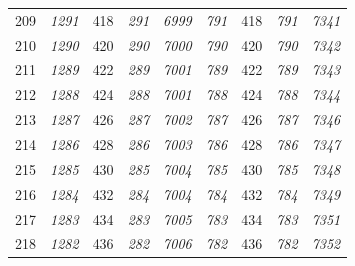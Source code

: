 \documentclass[10pt,fleqn]{article}
\begin{document}
\begin{longtable}{c|cccccccc}
209 & {\color{blue} \it 1291 \rm} & {\color{black} 418} & {\color{blue} \it 291 \rm} & {\color{blue} \it 6999 \rm} & {\color{blue} \it 791 \rm} & {\color{black} 418} & {\color{blue} \it 791 \rm} & {\color{blue} \it 7341 \rm} \\
210 & {\color{blue} \it 1290 \rm} & {\color{black} 420} & {\color{blue} \it 290 \rm} & {\color{blue} \it 7000 \rm} & {\color{blue} \it 790 \rm} & {\color{black} 420} & {\color{blue} \it 790 \rm} & {\color{blue} \it 7342 \rm} \\
211 & {\color{blue} \it 1289 \rm} & {\color{black} 422} & {\color{blue} \it 289 \rm} & {\color{blue} \it 7001 \rm} & {\color{blue} \it 789 \rm} & {\color{black} 422} & {\color{blue} \it 789 \rm} & {\color{blue} \it 7343 \rm} \\
212 & {\color{blue} \it 1288 \rm} & {\color{black} 424} & {\color{blue} \it 288 \rm} & {\color{blue} \it 7001 \rm} & {\color{blue} \it 788 \rm} & {\color{black} 424} & {\color{blue} \it 788 \rm} & {\color{blue} \it 7344 \rm} \\
213 & {\color{blue} \it 1287 \rm} & {\color{black} 426} & {\color{blue} \it 287 \rm} & {\color{blue} \it 7002 \rm} & {\color{blue} \it 787 \rm} & {\color{black} 426} & {\color{blue} \it 787 \rm} & {\color{blue} \it 7346 \rm} \\
214 & {\color{blue} \it 1286 \rm} & {\color{black} 428} & {\color{blue} \it 286 \rm} & {\color{blue} \it 7003 \rm} & {\color{blue} \it 786 \rm} & {\color{black} 428} & {\color{blue} \it 786 \rm} & {\color{blue} \it 7347 \rm} \\
215 & {\color{blue} \it 1285 \rm} & {\color{black} 430} & {\color{blue} \it 285 \rm} & {\color{blue} \it 7004 \rm} & {\color{blue} \it 785 \rm} & {\color{black} 430} & {\color{blue} \it 785 \rm} & {\color{blue} \it 7348 \rm} \\
216 & {\color{blue} \it 1284 \rm} & {\color{black} 432} & {\color{blue} \it 284 \rm} & {\color{blue} \it 7004 \rm} & {\color{blue} \it 784 \rm} & {\color{black} 432} & {\color{blue} \it 784 \rm} & {\color{blue} \it 7349 \rm} \\
217 & {\color{blue} \it 1283 \rm} & {\color{black} 434} & {\color{blue} \it 283 \rm} & {\color{blue} \it 7005 \rm} & {\color{blue} \it 783 \rm} & {\color{black} 434} & {\color{blue} \it 783 \rm} & {\color{blue} \it 7351 \rm} \\
218 & {\color{blue} \it 1282 \rm} & {\color{black} 436} & {\color{blue} \it 282 \rm} & {\color{blue} \it 7006 \rm} & {\color{blue} \it 782 \rm} & {\color{black} 436} & {\color{blue} \it 782 \rm} & {\color{blue} \it 7352 \rm} \\

\end{longtable}
\end{document}
